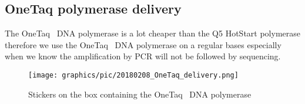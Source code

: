 \subsection{OneTaq polymerase delivery}
\label{task:20180208_cj3}

The OneTaq\texttrademark~ DNA polymerase is a lot cheaper than the Q5 HotStart polymerase therefore we use the OneTaq\texttrademark~ DNA polymerase on a regular bases especially when we know the amplification by PCR will not be followed by sequencing. 

\begin{figure}[H] %
    \centering
    \caption{Stickers on the box containing the OneTaq\texttrademark~ DNA polymerase}
    \label{fig:20180208_OneTaq_delivery}
    \texttt{[image: graphics/pic/20180208\_OneTaq\_delivery.png]}
\end{figure}

